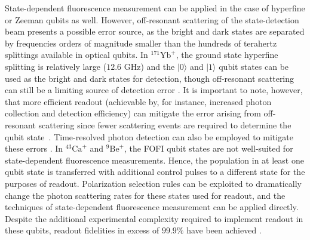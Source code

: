 \documentclass[%
reprint,
 amsmath,amssymb,
]{revtex4-1}
\begin{document}
State-dependent fluorescence measurement can be applied in the case of hyperfine or Zeeman qubits as well. However, off-resonant scattering of the state-detection beam presents a possible error source, as the bright and dark states are separated by frequencies orders of magnitude smaller than the hundreds of terahertz splittings available in optical qubits. In $^{171}\mathrm{Yb}^{+}$, the ground state hyperfine splitting is relatively large ($12.6$ GHz) and the $|0\rangle$ and  $|1\rangle$ qubit states can be used as the bright and dark states for detection, though off-resonant scattering can still be a limiting source of detection error \cite{noek2013high}. It is important to note, however, that more efficient readout (achievable by, for instance, increased photon collection and detection efficiency) can mitigate the error arising from off-resonant scattering since fewer scattering events are required to determine the qubit state~\cite{CrainSNSPDdetect2019}. Time-resolved photon detection can also be employed to mitigate these errors \cite{WolkTimeResolvedDetect2015}.  In $^{43}\mathrm{Ca}^{+}$ and $^{9}\mathrm{Be}^{+}$, the FOFI qubit states are not well-suited for state-dependent fluorescence measurements.  Hence, the population in at least one qubit state is transferred with additional control pulses to a different state for the purposes of readout. Polarization selection rules can be exploited to dramatically change the photon scattering rates for these states used for readout, and the techniques of state-dependent fluorescence measurement can be applied directly. Despite the additional experimental complexity required to implement readout in these qubits, readout fidelities in excess of $99.9 \%$ have been achieved \cite{HartyHighFidelityIons2014}.
\end{document}
